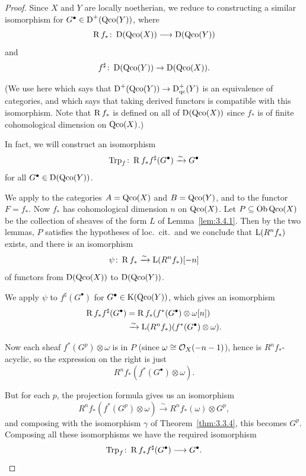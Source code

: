 \begin{proof}
Since $X$ and $Y$ are locally noetherian, we reduce to constructing a similar isomorphism for $G^\bullet\in\operatorname{D}^+(\operatorname{Qco}(Y))$, where
\[
\operatorname{R} f_*\colon \operatorname{D}(\operatorname{Qco}(X)) \longrightarrow \operatorname{D}(\operatorname{Qco}(Y))
\]
and \[f^{\sharp}\colon \operatorname{D}(\operatorname{Qco}(Y))\to\operatorname{D}(\operatorname{Qco}(X)).\]

(We use here  which says that $\operatorname{D}^+(\operatorname{Qco}(Y))\to\operatorname{D}_{\mathrm{qc}}^+(Y)$ is an equivalence of categories, and  which says that taking derived functors is compatible with this isomorphism. Note that $\operatorname{R} f_*$ is defined on all of $\operatorname{D}(\operatorname{Qco}(X))$ since $f_*$ is of finite cohomological dimension on $\operatorname{Qco}(X)$.)

In fact, we will construct an isomorphism
\[
\operatorname{Trp}_f\colon \operatorname{R} f_* f^{\sharp}(G^\bullet) \xrightarrow{\sim} G^\bullet
\]
for all $G^\bullet\in\operatorname{D}(\operatorname{Qco}(Y))$.

We apply  to the categories $A=\operatorname{Qco}(X)$ and $B=\operatorname{Qco}(Y)$, and to the functor $F=f_*$. Now $f_*$ has cohomological dimension $n$ on $\operatorname{Qco}(X)$. Let $P\subseteq\operatorname{Ob}\operatorname{Qco}(X)$ be the collection of sheaves of the form $L$ of Lemma~\ref{lem:3.4.1}. Then by the two lemmas, $P$ satisfies the hypotheses of loc.\ cit.\ and we conclude that $\operatorname{L}(R^n f_*)$ exists, and there is an isomorphism
\[
\psi\colon \operatorname{R} f_* \xrightarrow{\sim} \operatorname{L}(R^n f_*)[-n]
\]
of functors from $\operatorname{D}(\operatorname{Qco}(X))$ to $\operatorname{D}(\operatorname{Qco}(Y))$.

We apply $\psi$ to $f^{\sharp}(G^\bullet)$ for $G^\bullet\in\operatorname{K}(\operatorname{Qco}(Y))$, which gives an isomorphism
\begin{align*}
\operatorname{R} f_* f^{\sharp}(G^\bullet) &= \operatorname{R} f_* (f^*(G^\bullet)\otimes\omega[n]) \\
&\xrightarrow{\sim} \operatorname{L}(R^n f_*)(f^*(G^\bullet)\otimes\omega).
\end{align*}

Now each sheaf $f^*(G^p)\otimes\omega$ is in $P$ (since $\omega\cong\mathcal{O}_X(-n-1)$), hence is $R^n f_*$-acyclic, so the expression on the right is just
\[
R^n f_*(f^*(G^\bullet)\otimes\omega).
\]

But for each $p$, the projection formula gives us an isomorphism
\[
R^n f_*(f^*(G^p)\otimes\omega) \xrightarrow{\sim} R^n f_*(\omega)\otimes G^p,
\]
and composing with the isomorphism $\gamma$ of Theorem~\ref{thm:3.3.4}, this becomes $G^p$. Composing all these isomorphisms we have the required isomorphism
\[
\operatorname{Trp}_f \colon \operatorname{R} f_* f^{\sharp}(G^\bullet) \longrightarrow G^\bullet.
\]
\end{proof}

